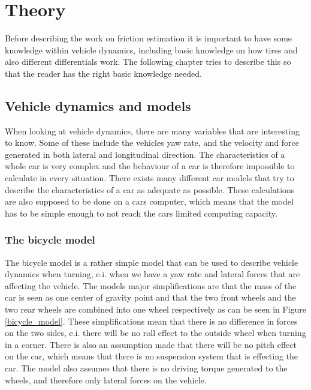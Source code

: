 \chapter{Theory}

Before describing the work on friction estimation it is important to have some knowledge within vehicle dynamics, including basic knowledge on how tires and also different differentials work. The following chapter tries to describe this so that the reader has the right basic knowledge needed.

\section{Vehicle dynamics and models}

When looking at vehicle dynamics, there are many variables that are interesting to know. Some of these include the vehicles yaw rate, and the velocity and force generated in both lateral and longitudinal direction. The characteristics of a whole car is very complex and the behaviour of a car is therefore impossible to calculate in every situation. There exists many different car models that try to describe the characteristics of a car as adequate as possible. These calculations are also supposed to be done on a cars computer, which means that the model has to be simple enough to not reach the cars limited computing capacity.

\subsection{The bicycle model}

The bicycle model is a rather simple model that can be used to describe vehicle dynamics when turning, e.i. when we have a yaw rate and lateral forces that are affecting the vehicle. The models major simplifications are that the mass of the car is seen as one center of gravity point and that the two front wheels and the two rear wheels are combined into one wheel respectively as can be seen in Figure \ref{bicycle_model}. These simplifications mean that there is no difference in forces on the two sides, e.i. there will be no roll effect to the outside wheel when turning in a corner. There is also an assumption made that there will be no pitch effect on the car, which means that there is no suspension system that is effecting the car. The model also assumes that there is no driving torque generated to the wheels, and therefore only lateral forces on the vehicle.

